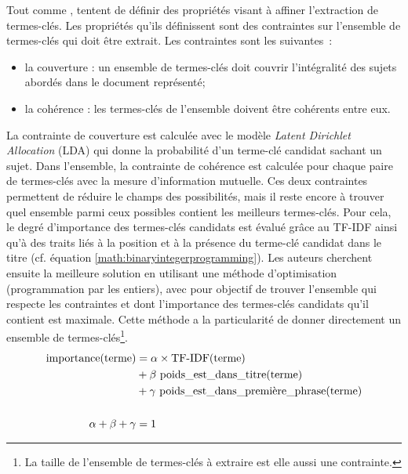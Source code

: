           Tout comme ,
           tentent de définir des
          propriétés visant à affiner l'extraction de termes-clés. Les
          propriétés qu'ils définissent sont des contraintes sur l'ensemble de
          termes-clés qui doit être extrait. Les contraintes sont les
          suivantes~:
          \begin{itemize}
            \item{la couverture : un ensemble de termes-clés doit couvrir
                  l'intégralité des sujets abordés dans le document
                  représenté;}
            \item{la cohérence : les termes-clés de l'ensemble doivent être
                  cohérents entre eux.}
          \end{itemize}
          La contrainte de couverture est calculée avec le modèle \textit{Latent
          Dirichlet Allocation} (LDA) \cite{blei2003lda} qui donne la
          probabilité d'un terme-clé candidat sachant un sujet. Dans l'ensemble,
          la contrainte de cohérence est calculée pour chaque paire de
          termes-clés avec la mesure d'information mutuelle. Ces deux
          contraintes permettent de réduire le champs des possibilités, mais il
          reste encore à trouver quel ensemble parmi ceux possibles contient les
          meilleurs termes-clés. Pour cela, le degré d'importance des
          termes-clés candidats est évalué grâce au TF-IDF ainsi qu'à des traits
          liés à la position et à la présence du terme-clé candidat dans le
          titre (cf. équation \ref{math:binaryintegerprogramming}). Les auteurs
          cherchent ensuite la meilleure solution en utilisant une méthode
          d'optimisation (programmation par les entiers), avec pour objectif de
          trouver l'ensemble qui respecte les contraintes et dont l'importance
          des termes-clés candidats qu'il contient est maximale. Cette méthode a
          la particularité de donner directement un ensemble de
          termes-clés\footnote{La taille de l'ensemble de termes-clés à extraire
          est elle aussi une contrainte.}.
          \begin{align}
            \text{importance}(\text{terme}) &= \alpha \times \text{TF-IDF}(\text{terme}) \notag\\
                              &+ \beta\ \text{poids\_est\_dans\_titre}(\text{terme}) \notag\\
                              &+ \gamma\ \text{poids\_est\_dans\_première\_phrase}(\text{terme}) \label{math:binaryintegerprogramming}\\
            \notag\\
            \alpha + \beta + \gamma &= 1 \notag
          \end{align}

